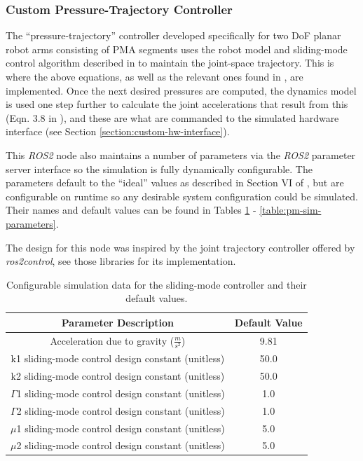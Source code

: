\documentclass[conference]{IEEEtran}
\begin{document}
	\subsubsection{Custom Pressure-Trajectory Controller}

	The ``pressure-trajectory'' controller developed specifically for two \ac{DoF} planar robot arms consisting of \ac{PMA} segments uses the robot model and sliding-mode control algorithm described in \cite{main-article} to maintain the joint-space trajectory. This is where the above equations, as well as the relevant ones found in \cite{main-article}, are implemented. Once the next desired pressures are computed, the dynamics model is used one step further to calculate the joint accelerations that result from this (Eqn. 3.8 in \cite{main-article}), and these are what are commanded to the simulated hardware interface (see Section \ref{section:custom-hw-interface}).

	This \textit{ROS2} node also maintains a number of parameters via the \textit{ROS2} parameter server interface so the simulation is fully dynamically configurable. The parameters default to the ``ideal'' values as described in Section VI of \cite{main-article}, but are configurable on runtime so any desirable system configuration could be simulated. Their names and default values can be found in Tables \ref{table:control-sim-parameters} - \ref{table:pm-sim-parameters}.

	The design for this node was inspired by the joint trajectory controller offered by \textit{ros2\textunderscore control}, see those libraries for its implementation.

	\begin{table}
		\centering
		\begin{tabular}{|c|c|}
			\hline
			\textbf{Parameter Description} & \textbf{Default Value} \\\hline
			Acceleration due to gravity ($\frac{m}{s^2}$) & 9.81 \\\hline
			k1 sliding-mode control design constant (unitless) & 50.0 \\\hline
			k2 sliding-mode control design constant (unitless) & 50.0 \\\hline
			$\Gamma$1 sliding-mode control design constant (unitless) & 1.0 \\\hline
			$\Gamma$2 sliding-mode control design constant (unitless) & 1.0 \\\hline
			$\mu$1 sliding-mode control design constant (unitless) & 5.0 \\\hline
			$\mu$2 sliding-mode control design constant (unitless) & 5.0 \\\hline
		\end{tabular}
		\caption{Configurable simulation data for the sliding-mode controller and their default values.}
		\label{table:control-sim-parameters}
	\end{table}
\end{document}
